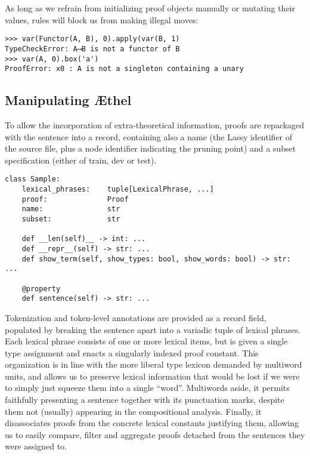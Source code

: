 \noindent As long as we refrain from initializing proof objects manually or mutating their values, rules will block us from making illegal moves:
\begin{verbatim}
>>> var(Functor(A, B), 0).apply(var(B, 1)
TypeCheckError: A⟶B is not a functor of B
>>> var(A, 0).box('a')
ProofError: x0 : A is not a singleton containing a unary
\end{verbatim}


\subsection{Manipulating \AE thel}
To allow the incorporation of extra-theoretical information, proofs are repackaged with the sentence into a  record, containing also a name (the Lassy identifier of the source file, plus a node identifier indicating the pruning point) and a subset specification (either of train, dev or test).

\begin{verbatim}
class Sample:
    lexical_phrases:    tuple[LexicalPhrase, ...]
    proof:              Proof
    name:               str
    subset:             str

	def __len(self)__ -> int: ...
	def __repr__(self) -> str: ...
    def show_term(self, show_types: bool, show_words: bool) -> str: ...
    
    @property
    def sentence(self) -> str: ...
\end{verbatim}

\noindent Tokenization and token-level annotations are provided as a record field, populated by breaking the sentence apart into a variadic tuple of lexical phrases.
Each lexical phrase consists of one or more lexical items, but is given a single type assignment and enacts a singularly indexed proof constant.
This organization is in line with the more liberal type lexicon demanded by multiword units, and allows us to preserve lexical information that would be lost if we were to simply just squeeze them into a single ``word''.
Multiwords aside, it permits faithfully presenting a sentence together with its punctuation marks, despite them not (usually) appearing in the compositional analysis.
Finally, it disassociates proofs from the concrete lexical constants justifying them, allowing us to easily compare, filter and aggregate proofs detached from the sentences they were assigned to.

